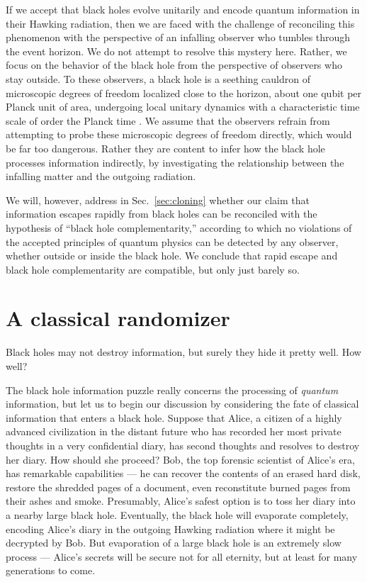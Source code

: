 \documentclass[12pt]{article}
\begin{document}
If we accept that black holes evolve unitarily and encode quantum information in their Hawking radiation, then we are faced with the challenge of reconciling this phenomenon with the perspective of an infalling observer who tumbles through the event horizon. We do not attempt to resolve this mystery here. Rather, we focus on the behavior of the black hole from the perspective of observers who stay outside. To these observers, a black hole is a seething cauldron of microscopic degrees of freedom localized close to the horizon, about one qubit per Planck unit of area, undergoing local unitary dynamics with a characteristic time scale of order the Planck time \cite{complement,susskind-book}. We assume that the observers refrain from attempting to probe these microscopic degrees of freedom directly, which would be far too dangerous. Rather they are content to infer how the black hole processes information indirectly, by investigating the relationship between the infalling matter and the outgoing radiation.

We will, however, address in Sec.~\ref{sec:cloning} whether our claim that information escapes rapidly from black holes can be reconciled with the hypothesis of ``black hole complementarity,'' according to which no violations of the accepted principles of quantum physics can be detected by any observer, whether outside or inside the black hole. We conclude that rapid escape and black hole complementarity are compatible, but only just barely so.

\section{A classical randomizer}
\label{sec:classical}
Black holes may not destroy information, but surely they hide it pretty well. How well?

The black hole information puzzle really concerns the processing of {\em quantum} information, but let us to begin our discussion by considering the fate of classical information that enters a black hole. Suppose that Alice, a citizen of a highly advanced civilization in the distant future who has recorded her most private thoughts in a very confidential diary, has second thoughts and resolves to destroy her diary. How should she proceed? Bob, the top forensic scientist of Alice's era, has remarkable capabilities --- he can recover the contents of an erased hard disk, restore the shredded pages of a document, even reconstitute  burned pages from their ashes and smoke. Presumably, Alice's safest option is to toss her diary into a nearby large black hole. Eventually, the black hole will evaporate completely, encoding Alice's diary in the outgoing Hawking radiation where it might be decrypted by Bob. But evaporation of a large black hole is an extremely slow process --- Alice's secrets will be secure not for all eternity, but at least for many generations to come.
\end{document}

